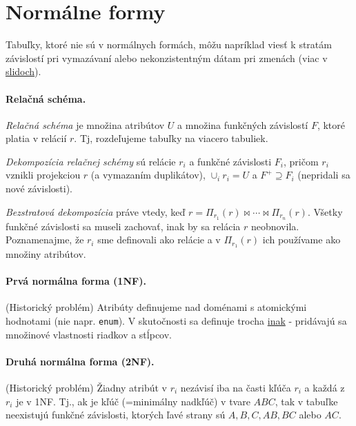 \documentclass[10pt,a4paper]{article}
\begin{document}
\section{Normálne formy}

Tabuľky, ktoré nie sú v normálnych formách, môžu napríklad viesť k stratám závislostí pri vymazávaní alebo nekonzistentným dátam pri zmenách (viac v \href{http://www.dcs.fmph.uniba.sk/~plachetk/TEACHING/DB2011/db2011_8.pdf}{slidoch}).

\paragraph{Relačná schéma.}
\emph{Relačná schéma} je množina atribútov $U$ a množina funkčných závislostí $F$, ktoré platia v relácií $r$. Tj, rozdeľujeme tabuľky na viacero tabuliek.

\emph{Dekompozícia relačnej schémy} sú relácie $r_i$ a funkčné závislosti $F_i$, pričom $r_i$ vznikli projekciou $r$ (a vymazaním duplikátov), $\cup_i r_i = U$ a $F^+ \supseteq F_i$ (nepridali sa nové závislosti).

\emph{Bezstratová dekompozícia} práve vtedy, keď $r = \Pi_{r_1}(r) \Join \cdots \Join \Pi_{r_n}(r)$. Všetky funkčné závislosti sa museli zachovať, inak by sa relácia $r$ neobnovila. Poznamenajme, že $r_i$ sme definovali ako relácie a v $\Pi_{r_1}(r) $ ich používame ako množiny atribútov.

\paragraph{Prvá normálna forma (1NF).} (Historický problém) Atribúty definujeme nad doménami s atomickými hodnotami (nie napr. \verb|enum|). V skutočnosti sa definuje trocha \href{http://en.wikipedia.org/wiki/First_normal_form}{inak} - pridávajú sa množinové vlastnosti riadkov a stĺpcov.

\paragraph{Druhá normálna forma (2NF).} (Historický problém) Žiadny atribút v $r_i$ nezávisí iba na časti kľúča $r_i$ a každá z $r_i$ je v 1NF. Tj., ak je kľúč (=minimálny nadkľúč) v tvare $ABC$, tak v tabuľke neexistujú funkčné závislosti, ktorých ľavé strany sú $A,B,C,AB,BC$ alebo $AC$.
\end{document}
